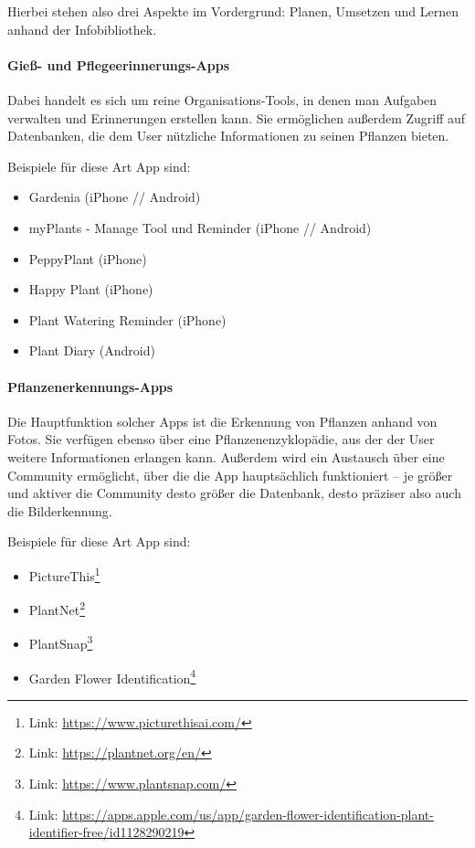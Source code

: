 Hierbei stehen also drei Aspekte im Vordergrund: Planen, Umsetzen und
Lernen anhand der Infobibliothek.

\hypertarget{gieuxdf--und-pflegeerinnerungs-apps}{%
\paragraph{Gieß- und
Pflegeerinnerungs-Apps}\label{gieuxdf--und-pflegeerinnerungs-apps}}

Dabei handelt es sich um reine Organisations-Tools, in denen man
Aufgaben verwalten und Erinnerungen erstellen kann. Sie ermöglichen
außerdem Zugriff auf Datenbanken, die dem User nützliche Informationen
zu seinen Pflanzen bieten.

Beispiele für diese Art App sind:

\begin{itemize}
\tightlist
\item
  Gardenia (iPhone // Android)
\item
  myPlants - Manage Tool und Reminder (iPhone // Android)
\item
  PeppyPlant (iPhone)
\item
  Happy Plant (iPhone)
\item
  Plant Watering Reminder (iPhone)
\item
  Plant Diary (Android)
\end{itemize}

\hypertarget{pflanzenerkennungs-apps}{%
\paragraph{Pflanzenerkennungs-Apps}\label{pflanzenerkennungs-apps}}

Die Hauptfunktion solcher Apps ist die Erkennung von Pflanzen anhand von
Fotos. Sie verfügen ebenso über eine Pflanzenenzyklopädie, aus der der
User weitere Informationen erlangen kann. Außerdem wird ein Austausch
über eine Community ermöglicht, über die die App hauptsächlich
funktioniert -- je größer und aktiver die Community desto größer die
Datenbank, desto präziser also auch die Bilderkennung.

Beispiele für diese Art App sind:

\begin{itemize}
\tightlist
\item
  PictureThis\footnote{Link: \url{https://www.picturethisai.com/}}
\item
  PlantNet\footnote{Link: \url{https://plantnet.org/en/}}
\item
  PlantSnap\footnote{Link: \url{https://www.plantsnap.com/}}
\item
  Garden Flower Identification\footnote{Link:
    \url{https://apps.apple.com/us/app/garden-flower-identification-plant-identifier-free/id1128290219}}
\end{itemize}

